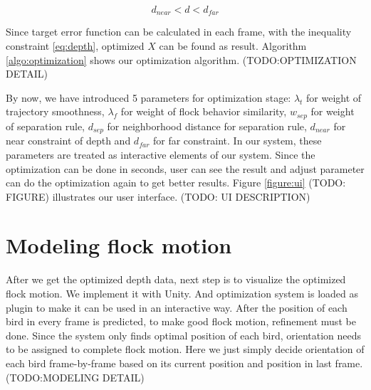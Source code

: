\begin{equation}\label{eq:depth}
d_{near} < d < d_{far}
\end{equation}

Since target error function can be calculated in each frame, with the inequality constraint \ref{eq:depth}, optimized $X$ can be found as result.  Algorithm \ref{algo:optimization}  shows our optimization algorithm.
(TODO:OPTIMIZATION DETAIL)


By now, we have introduced 5 parameters for optimization stage: $\lambda_{t}$ for weight of trajectory smoothness, $\lambda_{f}$ for weight of flock behavior similarity, $w_{sep}$ for weight of separation rule, $d_{sep}$ for neighborhood distance for separation rule, $d_{near}$ for near constraint of depth and $d_{far}$ for far constraint. In our system, these parameters are treated as interactive elements of our system. Since the optimization can be done in seconds, user can see the result and adjust parameter can do the optimization again to get better results. Figure \ref{figure:ui} (TODO: FIGURE) illustrates our user interface. (TODO: UI DESCRIPTION)


\section{Modeling flock motion}


After we get the optimized depth data, next step is to visualize the optimized flock motion. We implement it with Unity\cite{Unity}. And optimization system is loaded as plugin to make it can be used in an interactive way.
After the position of each bird in every frame is predicted, to make good flock motion, refinement must be done. Since the system only finds optimal position of each bird, orientation needs to be assigned to complete flock motion. Here we just simply decide orientation of each bird frame-by-frame based on its current position and position in last frame.
(TODO:MODELING DETAIL)
